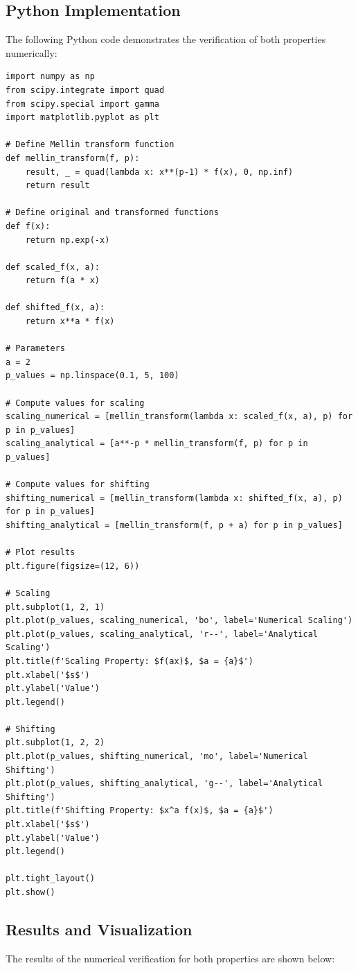 \documentclass[a4paper, 12pt]{article}
\begin{document}
\subsection{Python Implementation}
The following Python code demonstrates the verification of both properties numerically:
\begin{verbatim}
import numpy as np
from scipy.integrate import quad
from scipy.special import gamma
import matplotlib.pyplot as plt

# Define Mellin transform function
def mellin_transform(f, p):
    result, _ = quad(lambda x: x**(p-1) * f(x), 0, np.inf)
    return result

# Define original and transformed functions
def f(x):
    return np.exp(-x)

def scaled_f(x, a):
    return f(a * x)

def shifted_f(x, a):
    return x**a * f(x)

# Parameters
a = 2
p_values = np.linspace(0.1, 5, 100)

# Compute values for scaling
scaling_numerical = [mellin_transform(lambda x: scaled_f(x, a), p) for p in p_values]
scaling_analytical = [a**-p * mellin_transform(f, p) for p in p_values]

# Compute values for shifting
shifting_numerical = [mellin_transform(lambda x: shifted_f(x, a), p) for p in p_values]
shifting_analytical = [mellin_transform(f, p + a) for p in p_values]

# Plot results
plt.figure(figsize=(12, 6))

# Scaling
plt.subplot(1, 2, 1)
plt.plot(p_values, scaling_numerical, 'bo', label='Numerical Scaling')
plt.plot(p_values, scaling_analytical, 'r--', label='Analytical Scaling')
plt.title(f'Scaling Property: $f(ax)$, $a = {a}$')
plt.xlabel('$s$')
plt.ylabel('Value')
plt.legend()

# Shifting
plt.subplot(1, 2, 2)
plt.plot(p_values, shifting_numerical, 'mo', label='Numerical Shifting')
plt.plot(p_values, shifting_analytical, 'g--', label='Analytical Shifting')
plt.title(f'Shifting Property: $x^a f(x)$, $a = {a}$')
plt.xlabel('$s$')
plt.ylabel('Value')
plt.legend()

plt.tight_layout()
plt.show()
\end{verbatim}

\subsection{Results and Visualization}
The results of the numerical verification for both properties are shown below:
\end{document}
